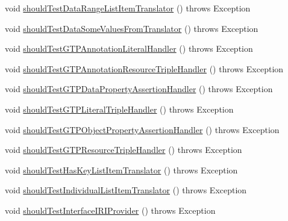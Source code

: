 \begin{DoxyCompactItemize}
\item 
void \hyperlink{classorg_1_1semanticweb_1_1owlapi_1_1contract_1_1_contract_rdfxml_parser_test_aeee4dac5c4289d7b8b3da26091679c35}{should\-Test\-Data\-Range\-List\-Item\-Translator} ()  throws Exception 
\item 
void \hyperlink{classorg_1_1semanticweb_1_1owlapi_1_1contract_1_1_contract_rdfxml_parser_test_a9ca2a89aae8ea7aeb0a3044de5a7fd03}{should\-Test\-Data\-Some\-Values\-From\-Translator} ()  throws Exception 
\item 
void \hyperlink{classorg_1_1semanticweb_1_1owlapi_1_1contract_1_1_contract_rdfxml_parser_test_a8bf1a29831db3b53aeecf26f0448fd97}{should\-Test\-G\-T\-P\-Annotation\-Literal\-Handler} ()  throws Exception 
\item 
void \hyperlink{classorg_1_1semanticweb_1_1owlapi_1_1contract_1_1_contract_rdfxml_parser_test_a81f59859b64c955cde63332d7600f94b}{should\-Test\-G\-T\-P\-Annotation\-Resource\-Triple\-Handler} ()  throws Exception 
\item 
void \hyperlink{classorg_1_1semanticweb_1_1owlapi_1_1contract_1_1_contract_rdfxml_parser_test_abcc6a7a5e2733f4a3f3b11aaa4ae00dc}{should\-Test\-G\-T\-P\-Data\-Property\-Assertion\-Handler} ()  throws Exception 
\item 
void \hyperlink{classorg_1_1semanticweb_1_1owlapi_1_1contract_1_1_contract_rdfxml_parser_test_a7735c9e01769943ded629d8af33c1efc}{should\-Test\-G\-T\-P\-Literal\-Triple\-Handler} ()  throws Exception 
\item 
void \hyperlink{classorg_1_1semanticweb_1_1owlapi_1_1contract_1_1_contract_rdfxml_parser_test_aceda636609f8d8ee512232872d624469}{should\-Test\-G\-T\-P\-Object\-Property\-Assertion\-Handler} ()  throws Exception 
\item 
void \hyperlink{classorg_1_1semanticweb_1_1owlapi_1_1contract_1_1_contract_rdfxml_parser_test_a56d4b22639fbdbe7574fb298217bb60d}{should\-Test\-G\-T\-P\-Resource\-Triple\-Handler} ()  throws Exception 
\item 
void \hyperlink{classorg_1_1semanticweb_1_1owlapi_1_1contract_1_1_contract_rdfxml_parser_test_a70e9c14a4efcd847952d923fe2adc207}{should\-Test\-Has\-Key\-List\-Item\-Translator} ()  throws Exception 
\item 
void \hyperlink{classorg_1_1semanticweb_1_1owlapi_1_1contract_1_1_contract_rdfxml_parser_test_a6b43bf16eb7e6d3f06d0c0f0d649185c}{should\-Test\-Individual\-List\-Item\-Translator} ()  throws Exception 
\item 
void \hyperlink{classorg_1_1semanticweb_1_1owlapi_1_1contract_1_1_contract_rdfxml_parser_test_a8a14a3c585ce49cfe7e119cf1534bc20}{should\-Test\-Interface\-I\-R\-I\-Provider} ()  throws Exception 

\end{DoxyCompactItemize}
